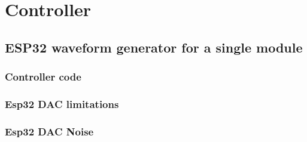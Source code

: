 \section{Controller}

\subsection{ESP32 waveform generator for a single module}

\subsubsection{Controller code}

\subsubsection{Esp32 DAC limitations}

\subsubsection{Esp32 DAC Noise}

